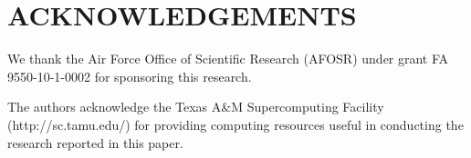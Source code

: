 %
%
%


\chapter*{ACKNOWLEDGEMENTS}


\indent We thank the Air Force Office of Scientific Research (AFOSR) under grant FA 9550-10-1-0002 for sponsoring this research.


The authors acknowledge the Texas A\&M Supercomputing Facility (http://sc.tamu.edu/) for providing computing resources useful in conducting the research reported in this paper.

\pagebreak{}